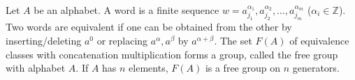 Let $A$ be an alphabet. A word is a finite sequence $w = a_{j_1}^{\alpha_1}, a_{j_2}^{\alpha_2}, \ldots, a_{j_m}^{\alpha_m}$ ($\alpha_i \in \mathbb{Z}$). Two words are equivalent if one can be obtained from the other by inserting/deleting $a^0$ or replacing $a^\alpha, a^\beta$ by $a^{\alpha+\beta}$. The set $F(A)$ of equivalence classes with concatenation multiplication forms a group, called the free group with alphabet $A$. If $A$ has $n$ elements, $F(A)$ is a free group on $n$ generators.
